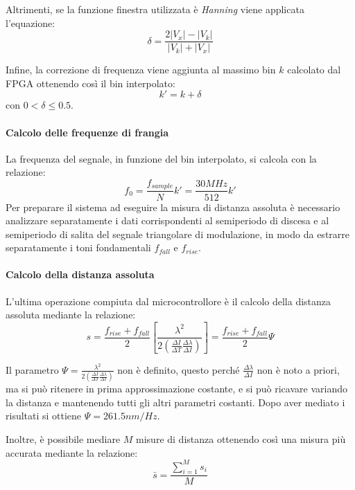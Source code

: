 Altrimenti, se la funzione finestra utilizzata è \textit{Hanning} viene applicata l'equazione:
\begin{equation}
	\delta = \frac{2|V_{x}|-|V_{k}|}{|V_{k}|+|V_{x}|}
\end{equation}

Infine, la correzione di frequenza  viene aggiunta al massimo bin $k$ calcolato dal FPGA ottenendo così il bin interpolato:
\begin{equation}
	k'=k+\delta
\end{equation}
con $ 0 < \delta \leq 0.5 $.

\paragraph{Calcolo delle frequenze di frangia}
La frequenza del segnale, in funzione del bin interpolato, si calcola con la relazione:
\begin{equation}
	f_0 = \frac{f_{sample}}{N} k' = \frac{30MHz}{512} k'
\end{equation}
Per preparare il sistema ad eseguire la misura di distanza assoluta è necessario analizzare separatamente i dati corrispondenti al semiperiodo di discesa e al semiperiodo di salita del segnale triangolare di modulazione, in modo da estrarre separatamente i toni fondamentali $f_{fall}$ e $f_{rise}$.

\paragraph{Calcolo della distanza assoluta}
L'ultima operazione compiuta dal microcontrollore è il calcolo della distanza assoluta mediante la relazione:
\begin{equation}
	s = \frac{f_{rise}+f_{fall}}{2} \left [ \frac{\lambda^2}{2\left ( \frac{\Delta I}{\Delta T} \frac{\Delta \lambda}{\Delta I} \right )}  \right ] = \frac{f_{rise}+f_{fall}}{2} \Psi
\end{equation}

Il parametro $\Psi = \frac{\lambda^2}{2\left ( \frac{\Delta I}{\Delta T} \frac{\Delta \lambda}{\Delta I} \right )} $ non è definito, questo perché $\frac{\Delta \lambda}{\Delta I}$ non è noto a priori, ma si può ritenere in prima approssimazione costante, e si può ricavare variando la distanza e mantenendo tutti gli altri parametri costanti. Dopo aver mediato i risultati si ottiene $\Psi=261.5 nm/Hz$.

Inoltre, è possibile mediare $M$ misure di distanza ottenendo così una misura più accurata mediante la relazione:
\begin{equation}
	\bar{s} = \frac{\sum_{i=1}^{M} s_i}{M}
\end{equation}

